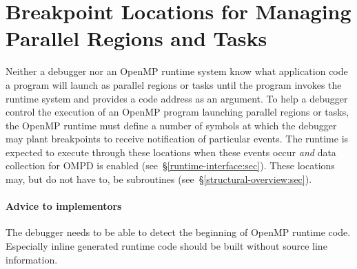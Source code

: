 \section{Breakpoint Locations for Managing Parallel Regions and Tasks}
\label{breakpoint-locations:sec}

Neither a debugger nor an OpenMP runtime system know what
application code a program will launch as parallel regions
or tasks until the program invokes the runtime system and
provides a code address as an argument.
To help a debugger control the execution of an OpenMP program
launching parallel regions or tasks,
the OpenMP runtime must define a number of symbols at which
the debugger may plant breakpoints to receive notification of
particular events.
The runtime is expected to execute through these locations when
these events occur \emph{and} data collection for OMPD is
enabled (see~\S\ref{runtime-interface:sec}).
These locations may, but do not have to, be subroutines
(see~\S\ref{structural-overview:sec}).

\paragraph{Advice to implementors} The debugger needs to be able to detect 
the beginning of OpenMP runtime code.
Especially inline generated runtime code should be built without source line
information.

